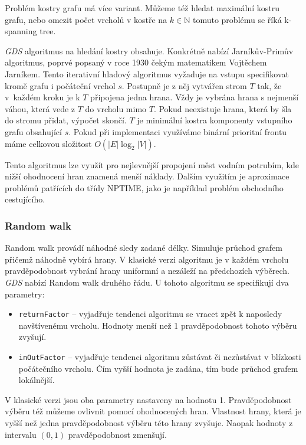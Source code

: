 \documentclass[
  program=infoi,
  biblatex=true,
  sourcecodes=true,
  figures=true,
  glossaries=false,
  index
]{kidiplom}
\begin{document}
 Problém kostry grafu má více variant. Můžeme též hledat maximální kostru grafu, nebo omezit počet vrcholů v kostře na $ k \in \mathbb{N}$ tomuto problému se říká k-spanning tree.

\textit{GDS} algoritmus na hledání kostry obsahuje. Konkrétně nabízí Jarníkův-Primův algoritmus, poprvé popsaný v roce 1930 čekým matematikem Vojtěchem Jarníkem. Tento iterativní hladový algoritmus vyžaduje na vstupu specifikovat kromě grafu i počáteční vrchol $s$. Postupně je z něj vytvářen strom $T$ tak, že v~každém kroku je k $T$ připojena jedna hrana. Vždy je vybrána hrana s nejmenší váhou, která vede z $T$ do vrcholu mimo $T$. Pokud neexistuje hrana, která by šla do stromu přidat, výpočet skončí. $T$ je minimální kostra komponenty vstupního grafu obsahující $s$. Pokud při implementaci využíváme binární prioritní frontu máme celkovou složitost $O(|E| \log_2 |V|)$.

Tento algoritmus lze využít pro nejlevnější propojení měst vodním potrubím, kde nižší ohodnocení hran znamená menší náklady. Dalším využitím je aproximace problémů patřících do třídy NPTIME, jako je například problém obchodního cestujícího. 

\subsubsection{Random walk}
Random walk provádí náhodné sledy zadané délky. Simuluje průchod grafem přičemž náhodně vybírá hrany. V klasické verzi algoritmu je v každém vrcholu pravděpodobnost vybrání hrany uniformní a nezáleží na předchozích výběrech. \textit{GDS} nabízí Random walk druhého řádu. U tohoto algoritmu se specifikují dva parametry:

\begin{itemize}
\item \texttt{returnFactor} -- vyjadřuje tendenci algoritmu se vracet zpět k naposledy navštívenému vrcholu. Hodnoty menší než 1 pravděpodobnost tohoto výběru zvyšují.
\item \texttt{inOutFactor} -- vyjadřuje tendenci algoritmu zůstávat či nezůstávat v blízkosti počátečního vrcholu. Čím vyšší hodnota je zadána, tím bude průchod grafem lokálnější.
\end{itemize}

V klasické verzi jsou oba parametry nastaveny na hodnotu 1. Pravděpodobnost výběru též můžeme ovlivnit pomocí ohodnocených hran. Vlastnost hrany, která je vyšší než jedna pravděpodobnost výběru této hrany zvyšuje. Naopak hodnoty z intervalu $(0,1)$ pravděpodobnost zmenšují.
\end{document}
